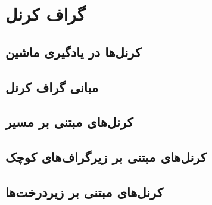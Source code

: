 \section{گراف کرنل}
\subsection{کرنل‌ها در یادگیری ماشین}
\subsection{مبانی گراف کرنل‌}
\subsection{کرنل‌های مبتنی بر مسیر}
\subsection{کرنل‌های مبتنی بر زیرگراف‌های کوچک}
\subsection{کرنل‌های مبتنی بر زیردرخت‌ها}
